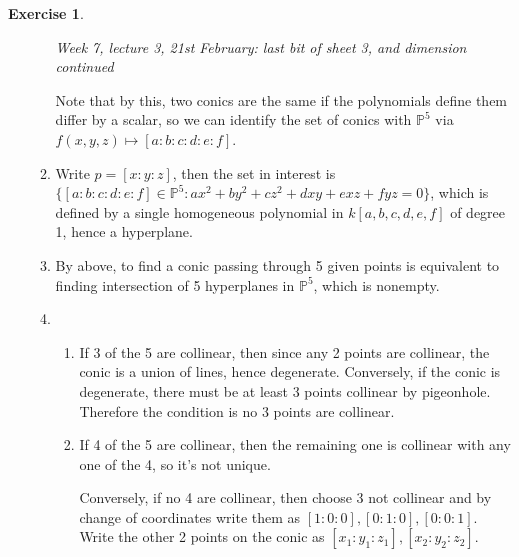 \documentclass{article}
\newcommand{\p}{\mathbb{P}}
\theoremstyle{definition}
\newtheorem{exe}[defn]{Exercise}
\begin{document}
\begin{exe}
\begin{enumerate}
\begin{enumerate}
\begin{flushright}
\textit{Week 7, lecture 3, 21st February: last bit of sheet 3, and dimension continued}
\end{flushright}

Note that by this, two conics are the same if the polynomials define them differ by a scalar, so we can identify the set of conics with $\p^5$ via $f(x,y,z)\mapsto [a:b:c:d:e:f]$.
\item Write $p=[x:y:z]$, then the set in interest is $\{[a:b:c:d:e:f]\in\p^5:ax^2+by^2+cz^2+dxy+exz+fyz=0\}$, which is defined by a single homogeneous polynomial in $k[a,b,c,d,e,f]$ of degree 1, hence a hyperplane.
\item By above, to find a conic passing through 5 given points is equivalent to finding intersection of 5 hyperplanes in $\p^5$, which is nonempty.
\item \begin{enumerate}
\item If 3 of the 5 are collinear, then since any 2 points are collinear, the conic is a union of lines, hence degenerate. Conversely, if the conic is degenerate, there must be at least 3 points collinear by pigeonhole. Therefore the condition is no 3 points are collinear.
\item If 4 of the 5 are collinear, then the remaining one is collinear with any one of the 4, so it's not unique.\vspace{0.25em} \begin{minipage}{0.7\textwidth}
Conversely, if no 4 are collinear, then choose 3 not collinear and by change of coordinates write them as $[1:0:0],[0:1:0],[0:0:1]$. Write the other 2 points on the conic as $[x_1:y_1:z_1],[x_2:y_2:z_2]$.
\end{minipage}\begin{minipage}{0.05\textwidth}\phantom{1}\end{minipage}\begin{minipage}{0.25\textwidth}
\end{minipage} \\


\end{enumerate}
\end{enumerate}
\end{enumerate}
\end{exe}
\end{document}
